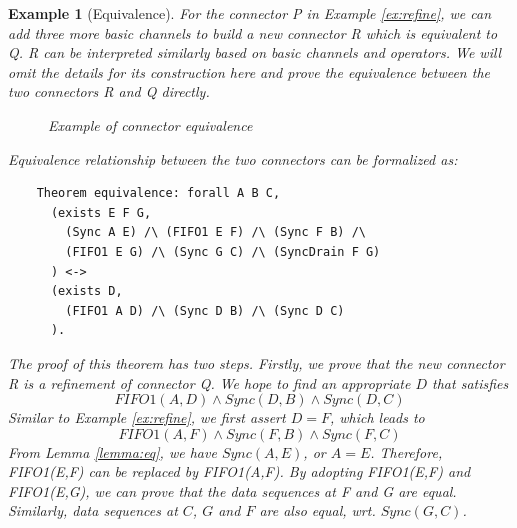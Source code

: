 \documentclass[3p,times]{elsarticle}
\newtheorem{example}{Example}[section]
\begin{document}
\begin{example}[Equivalence]
For the connector \emph{P} in Example \ref{ex:refine}, we can add three more basic channels to build a new connector \emph{R} which is equivalent to \emph{Q}. \emph{R} can be interpreted similarly based on basic channels and operators. We will omit the details for its construction here and prove the equivalence between the two connectors \emph{R} and \emph{Q} directly.

\begin{figure}
\vspace{0cm}
\centering
{}
\caption{Example of connector equivalence}
\label{refine1}

\end{figure}

Equivalence relationship between the two connectors can be formalized as:
\begin{verbatim}
    Theorem equivalence: forall A B C,
      (exists E F G,
        (Sync A E) /\ (FIFO1 E F) /\ (Sync F B) /\
        (FIFO1 E G) /\ (Sync G C) /\ (SyncDrain F G)
      ) <->
      (exists D,
        (FIFO1 A D) /\ (Sync D B) /\ (Sync D C)
      ).
\end{verbatim}
The proof of this theorem has two steps. Firstly, we prove that the new connector \emph{R} is a refinement of connector \emph{Q}.
We hope to find an appropriate \emph{$D$} that satisfies
\[
FIFO1(A,D)\wedge Sync(D,B) \wedge Sync(D,C)
\]
Similar to Example \ref{ex:refine}, we first assert $D=F$, which leads to
\[
FIFO1(A,F) \land Sync(F,B) \wedge Sync(F,C)
\]
From Lemma \ref{lemma:eq}, we have $Sync(A,E)$, or $A=E$. Therefore, \emph{FIFO1(E,F)} can be replaced by \emph{FIFO1(A,F)}. By adopting \emph{FIFO1(E,F)} and \emph{FIFO1(E,G)}, we can prove that the data sequences at \emph{F} and \emph{G} are equal. Similarly, data sequences at $C$, $G$ and $F$ are also equal, wrt. $Sync(G,C)$.


\end{example}
\end{document}
